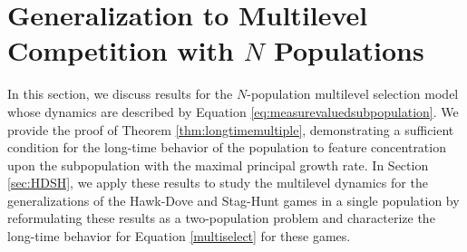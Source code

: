 \documentclass[11pt]{article}
\numberwithin{equation}{section}
\begin{document}
{\section{Generalization to Multilevel Competition with \texorpdfstring{$N$}{N} Populations}
\label{sec:multiplepopulations}

In this section, we discuss results for the $N$-population multilevel selection model whose dynamics are described by Equation \eqref{eq:measurevaluedsubpopulation}. We provide the proof of Theorem \ref{thm:longtimemultiple}, demonstrating a sufficient condition for the long-time behavior of the population to feature concentration upon the subpopulation with the maximal principal growth rate. In Section \ref{sec:HDSH}, we apply these results to study the multilevel dynamics for the generalizations of the Hawk-Dove and Stag-Hunt games in a single population by reformulating these results as a two-population problem and characterize the long-time behavior for Equation \eqref{multiselect} for these games.   

}
\end{document}

